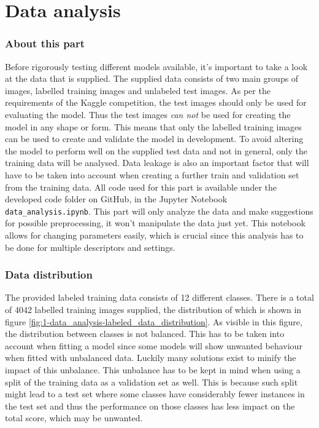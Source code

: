 \part{Data analysis}
\label{part:data_analysis}


\section{About this part}
\label{section:DA_about_part}
Before rigorously testing different models available, it's important to take a look at the data that is supplied.
The supplied data consists of two main groups of images, labelled training images and unlabeled test images.
As per the requirements of the Kaggle competition, the test images should only be used for evaluating the model.
Thus the test images \textit{can not} be used for creating the model in any shape or form.
This means that only the labelled training images can be used to create and validate the model in development.
To avoid altering the model to perform well on the supplied test data and not in general, only the training data will be analysed.
Data leakage is also an important factor that will have to be taken into account when creating a further train and validation set from the training data.
All code used for this part is available under the developed code folder on GitHub, in the Jupyter Notebook \texttt{data\_analysis.ipynb}.
This part will only analyze the data and make suggestions for possible preprocessing, it won't manipulate the data just yet.
This notebook allows for changing parameters easily, which is crucial since this analysis has to be done for multiple descriptors and settings.


\section{Data distribution}
\label{section:DA_data_distribution}
The provided labeled training data consists of 12 different classes.
There is a total of 4042 labelled training images supplied, the distribution of which is shown in figure \ref{fig:1-data_analysis-labeled_data_distribution}.
As visible in this figure, the distribution between classes is not balanced.
This has to be taken into account when fitting a model since some models will show unwanted behaviour when fitted with unbalanced data.
Luckily many solutions exist to minify the impact of this unbalance.
This unbalance has to be kept in mind when using a split of the training data as a validation set as well.
This is because such split might lead to a test set where some classes have considerably fewer instances in the test set and thus the performance on those classes has less impact on the total score, which may be unwanted.

